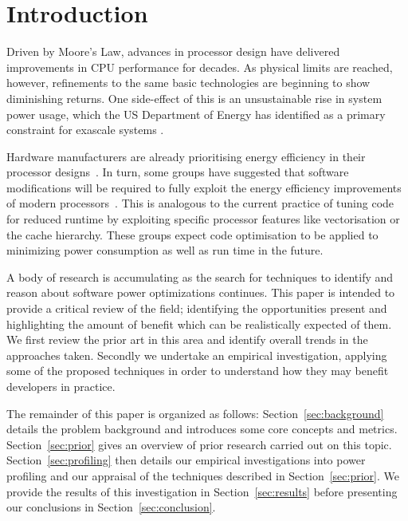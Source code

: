 \section*{Introduction \golden}
Driven by Moore's Law, advances in processor design have delivered improvements in CPU performance for decades. As physical limits are reached, however, refinements to the same basic technologies are beginning to show diminishing returns. One side-effect of this is an unsustainable rise in system power usage, which the US Department of Energy has identified as a primary constraint for exascale systems \cite{shalf:2011aa}. \golden

Hardware manufacturers are already prioritising energy efficiency in their processor designs~\cite{kurd:2014aa}. In turn, some groups have suggested that software modifications will be required to fully exploit the energy efficiency improvements of modern processors~\cite{shao:2013aa}. This is analogous to the current practice of tuning code for reduced runtime by exploiting specific processor features like vectorisation or the cache hierarchy. These groups expect code optimisation to be applied to minimizing power consumption as well as run time in the future. \golden

A body of research is accumulating as the search for techniques to identify and reason about software power optimizations continues. This paper is intended to provide a critical review of the field; identifying the opportunities present and highlighting the amount of benefit which can be realistically expected of them. We first review the prior art in this area and identify overall trends in the approaches taken. Secondly we undertake an empirical investigation, applying some of the proposed techniques in order to understand how they may benefit developers in practice. \golden

The remainder of this paper is organized as follows: Section~\ref{sec:background} details the problem background and introduces some core concepts and metrics. Section~\ref{sec:prior} gives an overview of prior research carried out on this topic. Section~\ref{sec:profiling} then details our empirical investigations into power profiling and our appraisal of the techniques described in Section~\ref{sec:prior}. We provide the results of this investigation in Section~\ref{sec:results} before presenting our conclusions in Section~\ref{sec:conclusion}. \golden